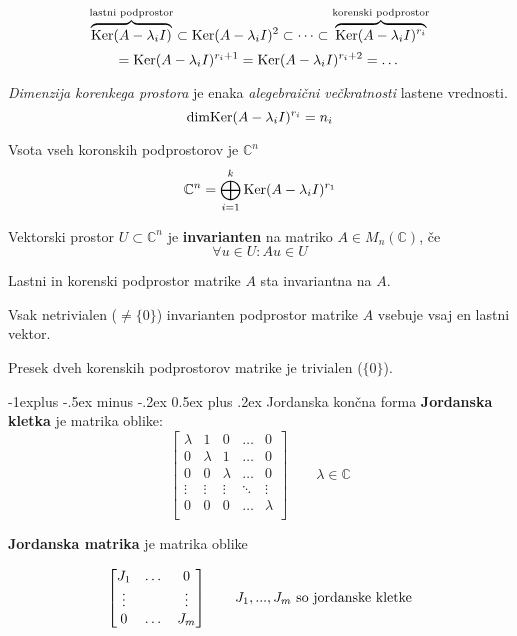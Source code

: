 \documentclass[a4paper,landscape]{article}
\makeatletter
\renewcommand{\subsection}{\@startsection{subsection}{2}{0mm}%
                                {-1explus -.5ex minus -.2ex}%
                                {0.5ex plus .2ex}%
                                {\normalfont\normalsize\bfseries}}
\makeatother
\begin{document}
\begin{multicols}{3}
\[\overbrace{\textmd{Ker}(A-\lambda_i I)}^{\textmd{lastni podprostor}} \subset \textmd{Ker}(A-\lambda_i I)^{2} \subset \dots \subset \overbrace{\textmd{Ker}(A-\lambda_i I)^{r_i}}^{\textmd{korenski podprostor}}\] 
\[ = \textmd{Ker}(A-\lambda_i I)^{r_i + 1} = \textmd{Ker}(A-\lambda_i I)^{r_i + 2} = \dots \]

\emph{Dimenzija korenkega prostora} je enaka \emph{alegebraični večkratnosti} lastene vrednosti.
\[\textmd{dimKer}(A-\lambda_i I)^{r_i} = n_i\]

Vsota vseh koronskih podprostorov je $\mathbb{C}^n$
\[\mathbb{C}^n = \bigoplus_{i=1}^{k} \textmd{Ker}(A-\lambda_i I)^{r_1}  \]

Vektorski prostor $U \subset \mathbb{C}^n$ je \textbf{invarianten} na matriko $A \in M_n(\mathbb{C})$, če
\[\forall u \in U : Au \in U\]

Lastni in korenski podprostor matrike $A$ sta invariantna na $A$.

Vsak netrivialen ($\neq \{0\}$) invarianten podprostor matrike $A$ vsebuje vsaj en lastni vektor.

Presek dveh korenskih podprostorov matrike je trivialen ($\{0\}$).

\subsection{Jordanska končna forma}
\textbf{Jordanska kletka} je matrika oblike:
\[
    \begin{bmatrix}
        \lambda & 1 & 0  & \dots & 0 \\
        0 & \lambda & 1  & \dots & 0 \\
        0 & 0 & \lambda  & \dots & 0 \\
        \vdots & \vdots & \vdots & \ddots & \vdots \\
        0 & 0 & 0  & \dots & \lambda \\

    \end{bmatrix}
    \qquad
    \lambda \in \mathbb{C}
\]

\textbf{Jordanska matrika} je matrika oblike

\[
    \begin{bmatrix}
        J_1 & \dots & 0 \\
        \vdots & & \vdots \\
        0 & \dots & J_m \\
    \end{bmatrix}    
    \qquad
    J_1, ..., J_m \textmd{ so jordanske kletke}
\]


\end{multicols}
\end{document}
